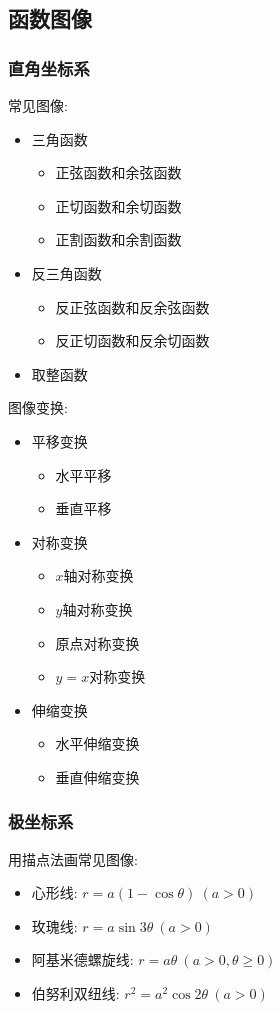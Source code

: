 \subsection{函数图像}
\subsubsection{直角坐标系}
常见图像:
\begin{itemize}
	\item 三角函数
	\begin{itemize}
		\item 正弦函数和余弦函数
		\item 正切函数和余切函数
		\item 正割函数和余割函数
	\end{itemize}
    \item 反三角函数
    \begin{itemize}
    	\item 反正弦函数和反余弦函数
    	\item 反正切函数和反余切函数
    \end{itemize}
    \item 取整函数
\end{itemize}
图像变换:
\begin{itemize}
	\item 平移变换
	\begin{itemize}
		\item 水平平移
		\item 垂直平移
	\end{itemize}
	\item 对称变换
	\begin{itemize}
		\item $ x $轴对称变换
		\item $ y $轴对称变换
		\item 原点对称变换
		\item $ y=x $对称变换
	\end{itemize}
	\item 伸缩变换
	\begin{itemize}
		\item 水平伸缩变换
		\item 垂直伸缩变换
	\end{itemize}
\end{itemize}
\subsubsection{极坐标系}
用描点法画常见图像:
\begin{itemize}
	\item 心形线: $ r=a(1-\cos \theta)\ (a>0) $
	\item 玫瑰线: $ r=a\sin 3\theta\ (a>0) $
	\item 阿基米德螺旋线: $ r=a\theta\ (a>0,\theta \ge 0) $
	\item 伯努利双纽线: $ r^{2}=a^{2}\cos 2\theta\ (a>0) $
\end{itemize}
